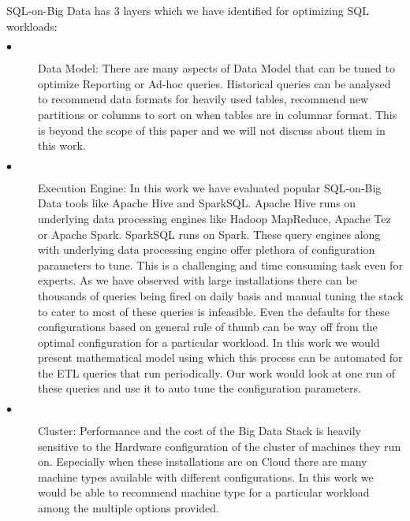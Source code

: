 SQL-on-Big Data has 3 layers which we have identified for optimizing SQL workloads:
\begin{description}
  \item[$\bullet$] Data Model:
  There are many aspects of Data Model that can be tuned to optimize Reporting or Ad-hoc queries.
  Historical queries can be analysed to recommend data formats for heavily used tables, recommend new partitions 
  or columns to sort on when tables are in columnar format. This is beyond the scope of this paper and we will not discuss about them in this work.
  \item[$\bullet$] Execution Engine:
  In this work we have evaluated popular SQL-on-Big Data tools like Apache Hive and SparkSQL. Apache Hive runs on underlying data processing engines like Hadoop MapReduce, Apache Tez or Apache Spark. SparkSQL runs on Spark. These query engines along with underlying data processing engine offer plethora of configuration parameters to tune. This is a challenging and time consuming task even for experts. As we have observed with large installations there can be thousands of queries being fired on daily basis and manual tuning the stack to cater to most of these queries is infeasible. Even the defaults for these configurations based on general rule of thumb can be way off from the optimal configuration for a particular workload. In this work we would present mathematical model using which this process can be automated for the ETL queries that run periodically. Our work would look at one run of these queries and use it to auto tune the configuration parameters.
  \item[$\bullet$] Cluster:
  Performance and the cost of the Big Data Stack is heavily sensitive to the Hardware configuration of the cluster of machines they run on. Especially when these installations are on Cloud there are many machine types available with different configurations. In this work we would be able to recommend machine type for a particular workload among the multiple options provided. 
\end{description}
